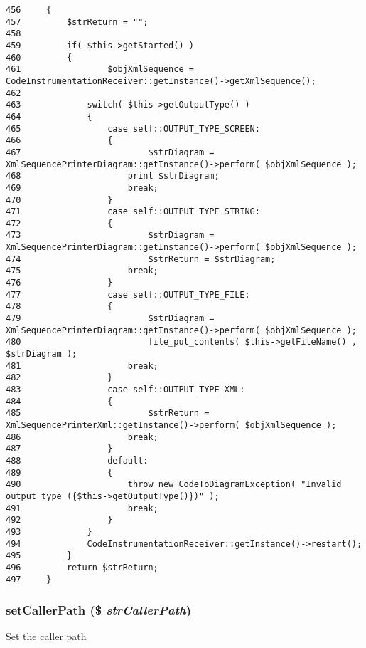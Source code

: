 \begin{Code}\begin{verbatim}456     {
457         $strReturn = "";
458 
459         if( $this->getStarted() )
460         {
461                 $objXmlSequence = CodeInstrumentationReceiver::getInstance()->getXmlSequence();
462 
463             switch( $this->getOutputType() )
464             {
465                 case self::OUTPUT_TYPE_SCREEN:
466                 {
467                         $strDiagram = XmlSequencePrinterDiagram::getInstance()->perform( $objXmlSequence );
468                     print $strDiagram;
469                     break;
470                 }
471                 case self::OUTPUT_TYPE_STRING:
472                 {
473                         $strDiagram = XmlSequencePrinterDiagram::getInstance()->perform( $objXmlSequence );
474                         $strReturn = $strDiagram;
475                     break;
476                 }
477                 case self::OUTPUT_TYPE_FILE:
478                 {
479                         $strDiagram = XmlSequencePrinterDiagram::getInstance()->perform( $objXmlSequence );
480                         file_put_contents( $this->getFileName() , $strDiagram );
481                     break;
482                 }
483                 case self::OUTPUT_TYPE_XML:
484                 {
485                         $strReturn = XmlSequencePrinterXml::getInstance()->perform( $objXmlSequence );
486                     break;
487                 }
488                 default:
489                 {
490                     throw new CodeToDiagramException( "Invalid output type ({$this->getOutputType()})" );
491                     break;
492                 }
493             }
494             CodeInstrumentationReceiver::getInstance()->restart();
495         }
496         return $strReturn;
497     }
\end{verbatim}
\end{Code}


\hypertarget{class_code_to_diagram_bdded6991e674ce82f04f701972ebf9f}{
\subsubsection[{setCallerPath}]{\setlength{\rightskip}{0pt plus 5cm}setCallerPath (\$ {\em strCallerPath})}}
\label{class_code_to_diagram_bdded6991e674ce82f04f701972ebf9f}


Set the caller path

